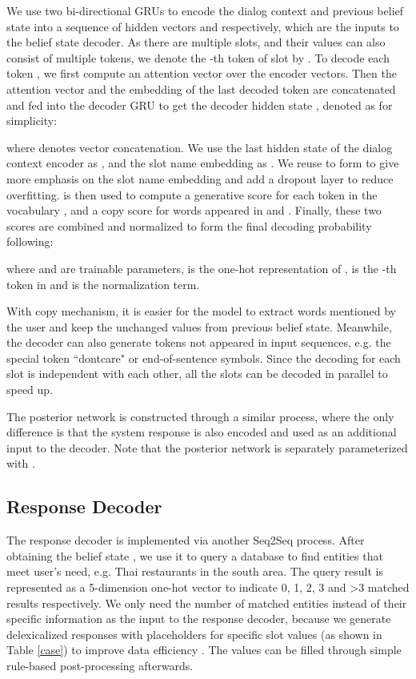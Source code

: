 \documentclass[11pt,a4paper]{article}
\begin{document}
	We use two bi-directional GRUs \cite{cho2014learning} to encode the dialog context  and previous belief state  into a sequence of hidden vectors  and  respectively, which are the inputs to the belief state decoder. As there are multiple slots, and their values can also consist of multiple tokens, we denote the -th token of slot  by . To decode each token , we first compute an attention vector over the encoder vectors. Then the attention vector and the embedding of the last decoded token  are concatenated and fed into the decoder GRU to get the decoder hidden state , denoted as  for simplicity:

	where  denotes vector concatenation. We use the last hidden state of the dialog context encoder as , and the slot name embedding as . We reuse  to form  to give more emphasis on the slot name embedding and add a dropout layer to reduce overfitting.  is then used to compute a generative score  for each token  in the vocabulary , and a copy score  for words appeared in  and . Finally, these two scores are combined and normalized to form the final decoding probability following:

	where  and  are trainable parameters,  is the one-hot representation of ,  is the -th token in  and  is the normalization term. 
	
	With copy mechanism, it is easier for the model to extract words mentioned by the user and keep the unchanged values from previous belief state. Meanwhile, the decoder can also generate tokens not appeared in input sequences, e.g. the special token ``dontcare" or end-of-sentence symbols. Since the decoding for each slot is independent with each other, all the slots can be decoded in parallel to speed up. 


	The posterior network  is constructed through a similar process, where the only difference is that the system response  is also encoded and used as an additional input to the decoder. Note that the posterior network is separately parameterized with .
	
	
\subsection*{Response Decoder}
\label{sec:resp_dec}
	The response decoder is implemented via another Seq2Seq process.
	After obtaining the belief state , we use it to query a database to find entities that meet user's need, e.g. Thai restaurants in the south area. The query result  is represented as a 5-dimension one-hot vector to indicate 0, 1, 2, 3 and \textgreater3 matched results respectively. We only need the number of matched entities instead of their specific information as the input to the response decoder, because we generate delexicalized responses with placeholders for specific slot values (as shown in Table \ref{case}) to improve data efficiency \cite{wen2015semantically}. The values can be filled through simple rule-based post-processing afterwards. 
\end{document}
